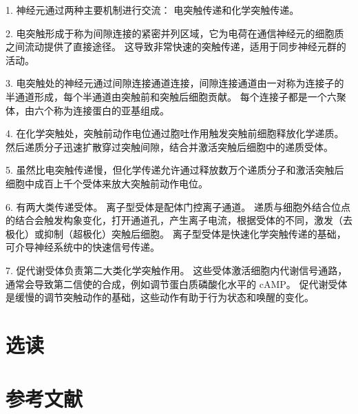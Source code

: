 1. 神经元通过两种主要机制进行交流：
电突触传递和化学突触传递。 


2. 电突触形成于称为间隙连接的紧密并列区域，它为电荷在通信神经元的细胞质之间流动提供了直接途径。 
这导致非常快速的突触传递，适用于同步神经元群的活动。 


3. 电突触处的神经元通过间隙连接通道连接，间隙连接通道由一对称为连接子的半通道形成，每个半通道由突触前和突触后细胞贡献。 
每个连接子都是一个六聚体，由六个称为连接蛋白的亚基组成。 


4. 在化学突触处，突触前动作电位通过胞吐作用触发突触前细胞释放化学递质。 
然后递质分子迅速扩散穿过突触间隙，结合并激活突触后细胞中的递质受体。 


5. 虽然比电突触传递慢，但化学传递允许通过释放数万个递质分子和激活突触后细胞中成百上千个受体来放大突触前动作电位。 


6. 有两大类传递受体。 
离子型受体是配体门控离子通道。 
递质与细胞外结合位点的结合会触发构象变化，打开通道孔，产生离子电流，根据受体的不同，激发（去极化）或抑制（超极化）突触后细胞。 
离子型受体是快速化学突触传递的基础，可介导神经系统中的快速信号传递。 


7. 促代谢受体负责第二大类化学突触作用。 
这些受体激活细胞内代谢信号通路，通常会导致第二信使的合成，例如调节蛋白质磷酸化水平的 cAMP。 
促代谢受体是缓慢的调节突触动作的基础，这些动作有助于行为状态和唤醒的变化。


\section{选读}

\section{参考文献}